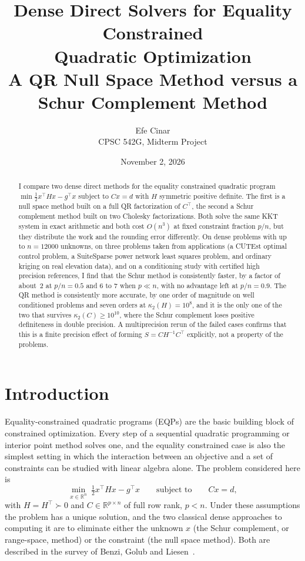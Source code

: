 \documentclass[10pt]{article}
\title{Dense Direct Solvers for Equality Constrained\\Quadratic Optimization\\
\large A QR Null Space Method versus a Schur Complement Method}
\author{Efe Cinar\\CPSC 542G, Midterm Project}
\date{November 2, 2026}
\newcommand{\kap}{\kappa_2}
\begin{document}
\maketitle

\begin{abstract}
I compare two dense direct methods for the equality constrained quadratic program
$\min \tfrac12 x^\top Hx - g^\top x$ subject to $Cx=d$ with $H$ symmetric positive definite.
The first is a null space method built on a full QR factorization of $C^\top$, the second
a Schur complement method built on two Cholesky factorizations. Both solve the same KKT system in exact
arithmetic and both cost $O(n^3)$ at fixed constraint fraction $p/n$, but they distribute
the work and the rounding error differently. On dense problems with up
to $n=12000$ unknowns, on three problems taken from applications (a CUTEst optimal control
problem, a SuiteSparse power network least squares problem, and ordinary kriging on real
elevation data), and on a conditioning study with certified high precision references,
I find that the Schur method is consistently faster, by a factor of about~2 at
$p/n=0.5$ and 6 to 7 when $p\ll n$, with no advantage left at $p/n=0.9$. The QR method is
consistently more accurate, by one order of magnitude on well conditioned problems and
seven orders at $\kap(H)=10^8$, and it is the only one of the two that survives
$\kap(C)\ge 10^{10}$, where the Schur complement loses positive definiteness in double
precision. A multiprecision rerun of the failed cases confirms that this is a
finite precision effect of forming $S=CH^{-1}C^\top$ explicitly, not a property of the
problems.
\end{abstract}

\section{Introduction}

Equality-constrained quadratic programs (EQPs) are the basic building block of
constrained optimization. Every step of a sequential quadratic programming or
interior point method solves one, and the equality constrained case is also the simplest
setting in which the interaction between an objective and a set of constraints can be
studied with linear algebra alone. The problem considered here is
\begin{equation}\label{eq:qp}
\min_{x\in\mathbb R^n}\ \tfrac12 x^\top H x - g^\top x
\qquad\text{subject to}\qquad Cx=d,
\end{equation}
with $H=H^\top\succ 0$ and $C\in\mathbb R^{p\times n}$ of full row rank, $p<n$.
Under these assumptions the problem has a unique solution, and the two classical dense
approaches to computing it are to eliminate either the unknown $x$ (the Schur complement,
or range-space, method) or the constraint (the null space method). Both are described in
the survey of Benzi, Golub and Liesen~\cite{benzi2005}.
\end{document}
